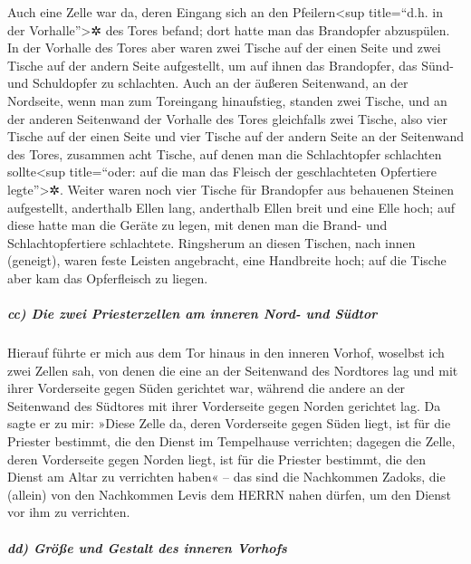 Auch eine Zelle war da, deren Eingang sich an den
Pfeilern\textless sup title=``d.h. in der Vorhalle''\textgreater✲ des
Tores befand; dort hatte man das Brandopfer abzuspülen.
In der Vorhalle des Tores aber waren zwei Tische auf der
einen Seite und zwei Tische auf der andern Seite aufgestellt, um auf
ihnen das Brandopfer, das Sünd- und Schuldopfer zu schlachten.
Auch an der äußeren Seitenwand, an der Nordseite, wenn
man zum Toreingang hinaufstieg, standen zwei Tische, und an der anderen
Seitenwand der Vorhalle des Tores gleichfalls zwei Tische,
also vier Tische auf der einen Seite und vier Tische auf
der andern Seite an der Seitenwand des Tores, zusammen acht Tische, auf
denen man die Schlachtopfer schlachten sollte\textless sup title=``oder:
auf die man das Fleisch der geschlachteten Opfertiere
legte''\textgreater✲. Weiter waren noch vier Tische für
Brandopfer aus behauenen Steinen aufgestellt, anderthalb Ellen lang,
anderthalb Ellen breit und eine Elle hoch; auf diese hatte man die
Geräte zu legen, mit denen man die Brand- und Schlachtopfertiere
schlachtete. Ringsherum an diesen Tischen, nach innen
(geneigt), waren feste Leisten angebracht, eine Handbreite hoch; auf die
Tische aber kam das Opferfleisch zu liegen.

\hypertarget{cc-die-zwei-priesterzellen-am-inneren-nord--und-suxfcdtor}{%
\subparagraph{cc) Die zwei Priesterzellen am inneren Nord- und
Südtor}\label{cc-die-zwei-priesterzellen-am-inneren-nord--und-suxfcdtor}}

Hierauf führte er mich aus dem Tor hinaus in den inneren
Vorhof, woselbst ich zwei Zellen sah, von denen die eine an der
Seitenwand des Nordtores lag und mit ihrer Vorderseite gegen Süden
gerichtet war, während die andere an der Seitenwand des Südtores mit
ihrer Vorderseite gegen Norden gerichtet lag. Da sagte er
zu mir: »Diese Zelle da, deren Vorderseite gegen Süden liegt, ist für
die Priester bestimmt, die den Dienst im Tempelhause verrichten;
dagegen die Zelle, deren Vorderseite gegen Norden liegt,
ist für die Priester bestimmt, die den Dienst am Altar zu verrichten
haben« -- das sind die Nachkommen Zadoks, die (allein) von den
Nachkommen Levis dem HERRN nahen dürfen, um den Dienst vor ihm zu
verrichten.

\hypertarget{dd-gruxf6uxdfe-und-gestalt-des-inneren-vorhofs}{%
\subparagraph{dd) Größe und Gestalt des inneren
Vorhofs}\label{dd-gruxf6uxdfe-und-gestalt-des-inneren-vorhofs}}

